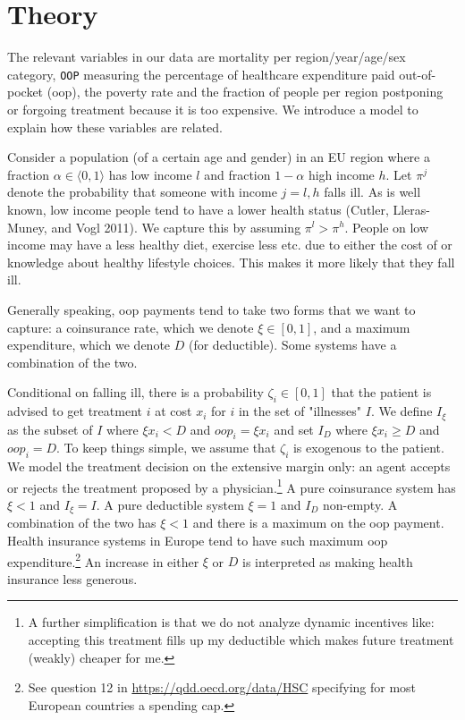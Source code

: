 \documentclass[a4paper,12pt]{article}
\makeatletter
\newcommand{\citeprocitem}[2]{\hyper@linkstart{cite}{citeproc_bib_item_#1}#2\hyper@linkend}
\makeatother
\begin{document}
\section{Theory}
\label{sec:org95c9fb9}

The relevant variables in our data are mortality per region/year/age/sex category, \texttt{OOP} measuring the percentage of healthcare expenditure paid out-of-pocket (oop), the poverty rate and the fraction of people per region postponing or forgoing treatment because it is too expensive. We introduce a model to explain how these variables are related.

Consider a population (of a certain age and gender) in an EU region where a fraction \(\alpha \in \langle 0,1 \rangle\) has low income \(l\) and fraction \(1-\alpha\) high income \(h\). Let \(\pi^j\) denote the probability that someone with income \(j=l,h\) falls ill. As is well known, low income people tend to have a lower health status (\citeprocitem{9}{Cutler, Lleras-Muney, and Vogl 2011}). We capture this by assuming \(\pi^l > \pi^h\). People on low income may have a less healthy diet, exercise less etc. due to either the cost of or knowledge about healthy lifestyle choices. This makes it more likely that they fall ill.

Generally speaking, oop payments tend to take two forms that we want to capture: a coinsurance rate, which we denote \(\xi \in [0,1]\), and a maximum expenditure, which we denote \(D\) (for deductible). Some systems have a combination of the two.

Conditional on falling ill, there is a probability \(\zeta_i \in [0,1]\) that the patient is advised to get treatment \(i\) at cost \(x_i\) for \(i\) in the set of "illnesses" \(I\). We define \(I_{\xi}\) as the subset of \(I\) where \(\xi x_i < D\) and \(oop_i = \xi x_i\) and set \(I_D\) where \(\xi x_i \geq D\) and \(oop_i = D\). To keep things simple, we assume that \(\zeta_i\) is exogenous to the patient. We model the treatment decision on the extensive margin only: an agent accepts or rejects the treatment proposed by a physician.\footnote{A further simplification is that we do not analyze dynamic incentives like: accepting this treatment fills up my deductible which makes future treatment (weakly) cheaper for me.} A pure coinsurance system has \(\xi < 1\) and \(I_{\xi}=I\). A pure deductible system \(\xi=1\) and \(I_D\) non-empty. A combination of the two has \(\xi<1\) and there is a maximum on the oop payment. Health insurance systems in Europe tend to have such maximum oop expenditure.\footnote{See question 12 in \url{https://qdd.oecd.org/data/HSC} specifying for most European countries a spending cap.} An increase in either \(\xi\) or \(D\) is interpreted as making health insurance less generous.
\end{document}
